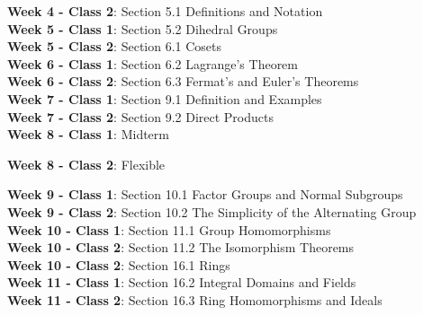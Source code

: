 \documentclass[10pt]{amsart}
\begin{document}
{\bf Week 4 - Class 2}: Section 5.1 Definitions and Notation\\

{\bf Week 5 - Class 1}: Section 5.2 Dihedral Groups\\

{\bf Week 5 - Class 2}: Section 6.1 Cosets \\

{\bf Week 6 - Class 1}: Section 6.2 Lagrange's Theorem\\	

{\bf Week 6 - Class 2}: Section 6.3 Fermat's and Euler's Theorems\\

{\bf Week 7 - Class 1}:  Section 9.1 Definition and Examples\\

{\bf Week 7 - Class 2}: Section 9.2 Direct Products  \\

{\bf Week 8 - Class 1}: Midterm

{\bf Week 8 - Class 2}: Flexible

{\bf Week 9 - Class 1}: Section 10.1 Factor Groups and Normal Subgroups \\

{\bf Week 9 - Class 2}: Section 10.2 The Simplicity of the Alternating Group\\

{\bf Week 10 - Class 1}: Section 11.1 Group Homomorphisms\\

{\bf Week 10 - Class 2}: Section 11.2 The Isomorphism Theorems \\

{\bf Week 10 - Class 2}: Section 16.1 Rings\\

{\bf Week 11 - Class 1}:  Section 16.2 Integral Domains and Fields  \\

{\bf Week 11 - Class 2}: Section 16.3 Ring Homomorphisms and Ideals\\
\end{document}
